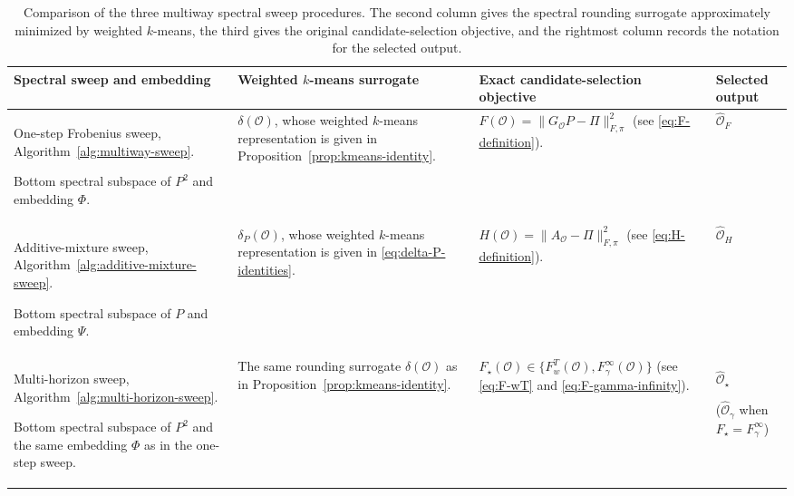 \documentclass[11pt]{article}
\newcommand{\1}{\mathbf{1}}
\begin{document}
\begin{table}[H]
	\centering
	\small
	\caption{Comparison of the three multiway spectral sweep procedures.
		The second column gives the spectral rounding surrogate approximately
		minimized by weighted $k$-means, the third gives the original
		candidate-selection objective, and the rightmost column records the
		notation for the selected output.}
	\label{tab:spectral-sweep-comparison}
	
	\begingroup
	\renewcommand{\arraystretch}{1.25}
	\begin{tabularx}{\textwidth}{
			@{}
			>{\raggedright\arraybackslash}p{}
			>{\raggedright\arraybackslash}p{}
			>{\raggedright\arraybackslash}X
			>{\centering\arraybackslash}p{}
			@{}
		}
		\toprule
		Spectral sweep and embedding
		&
		Weighted $k$-means surrogate
		&
		Exact candidate-selection objective
		&
		Selected output
		\\
		\midrule
		\addlinespace
		
		One-step Frobenius sweep,
		Algorithm~\ref{alg:multiway-sweep}.
		
		Bottom spectral subspace of $P^2$ and embedding $\Phi$.
		&
		$\delta(\mathcal O)$, whose weighted $k$-means representation is
		given in Proposition~\ref{prop:kmeans-identity}.
		&
		$
		F(\mathcal O)
		=
		\|G_{\mathcal O}P-\Pi\|_{F,\pi}^2
		$
		(see \eqref{eq:F-definition}).
		&
		$\widehat{\mathcal O}_F$ 
		\\
		\addlinespace
		
		Additive-mixture sweep,
		Algorithm~\ref{alg:additive-mixture-sweep}.
		
		Bottom spectral subspace of $P$ and embedding $\Psi$.
		&
		$\delta_P(\mathcal O)$, whose weighted $k$-means representation is
		given in \eqref{eq:delta-P-identities}.
		&
		$
		H(\mathcal O)
		=
		\|A_{\mathcal O}-\Pi\|_{F,\pi}^2
		$
		(see \eqref{eq:H-definition}).
		&
		$\widehat{\mathcal O}_H$
		\\
		\addlinespace
		
		Multi-horizon sweep,
		Algorithm~\ref{alg:multi-horizon-sweep}.
		
		Bottom spectral subspace of $P^2$ and the same embedding $\Phi$ as in the
		one-step sweep.
		&
		The same rounding surrogate $\delta(\mathcal O)$ as in
		Proposition~\ref{prop:kmeans-identity}.
		&
		$
		F_\star(\mathcal O)
		\in
		\bigl\{
		F_w^T(\mathcal O),
		F_\gamma^\infty(\mathcal O)
		\bigr\}
		$
		(see \eqref{eq:F-wT} and
		\eqref{eq:F-gamma-infinity}).
		&
		$\widehat{\mathcal O}_\star$

		($\widehat{\mathcal O}_\gamma$ when
		$F_\star=F_\gamma^\infty$)
		\\
		\bottomrule
	\end{tabularx}
	\endgroup
\end{table}
\end{document}
